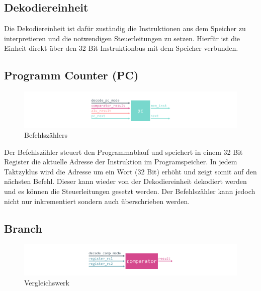         \subsection{Dekodiereinheit}
            
            Die Dekodiereinheit ist dafür zuständig die Instruktionen aus dem Speicher zu interpretieren und die notwendigen
            Steuerleitungen zu setzen.
            Hierfür ist die Einheit direkt über den 32 Bit Instruktionbus mit dem Speicher verbunden.

        \subsection{Programm Counter (PC)}\label{lab:pc}

            \begin{figure}[H]
                \centering
                \includegraphics[scale=1]{img/block_pc.pdf}
                \caption{Befehlszählers}
                \label{fig:pc}
            \end{figure}

            Der Befehlszähler steuert den Programmablauf und speichert in einem 32 Bit Register
            die aktuelle Adresse der Instruktion im Programspeicher.
            In jedem Taktzyklus wird die Adresse um ein Wort (32 Bit) erhöht und zeigt somit
            auf den nächsten Befehl. Dieser kann wieder von der Dekodiereinheit dekodiert werden
            und es können die Steuerleitungen gesetzt werden. Der Befehlszähler kann jedoch nicht nur
            inkrementiert sondern auch überschrieben werden.

            

        \subsection{Branch}

            \begin{figure}[H]
                \centering
                \includegraphics[scale=1]{img/block_comparator.pdf}
                \caption{Vergleichswerk}
                \label{fig:alu}
            \end{figure}

